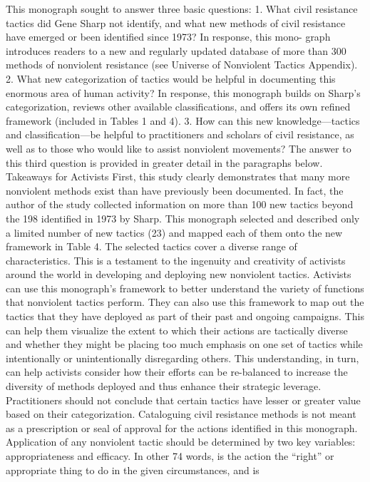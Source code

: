 \documentclass[twoside,a4paper,12pt,fleqn,openany]{extbook}
\begin{document}
This monograph sought to answer three basic questions:
1.	What civil resistance tactics did Gene Sharp not identify, and what new methods of
civil resistance have emerged or been identified since 1973? In response, this mono-
graph introduces readers to a new and regularly updated database of more than 300
methods of nonviolent resistance (see Universe of Nonviolent Tactics Appendix).
2.	 What new categorization of tactics would be helpful in documenting this enormous
area of human activity? In response, this monograph builds on Sharp’s categorization,
reviews other available classifications, and offers its own refined framework (included
in Tables 1 and 4).
3.	 How can this new knowledge—tactics and classification—be helpful to practitioners
and scholars of civil resistance, as well as to those who would like to assist nonviolent
movements? The answer to this third question is provided in greater detail in the
paragraphs below.
Takeaways for Activists
First, this study clearly demonstrates that many more nonviolent methods exist than have
previously been documented. In fact, the author of the study collected information on more
than 100 new tactics beyond the 198 identified in 1973 by Sharp.
This monograph selected and described only a limited number of new tactics (23) and
mapped each of them onto the new framework in Table 4. The selected tactics cover a diverse
range of characteristics. This is a testament to the ingenuity and creativity of activists around
the world in developing and deploying new nonviolent tactics.
Activists can use this monograph’s framework to better understand the variety of functions
that nonviolent tactics perform. They can also use this framework to map out the tactics that
they have deployed as part of their past and ongoing campaigns. This can help them visualize
the extent to which their actions are tactically diverse and whether they might be placing too
much emphasis on one set of tactics while intentionally or unintentionally disregarding others.
This understanding, in turn, can help activists consider how their efforts can be re-balanced
to increase the diversity of methods deployed and thus enhance their strategic leverage.
Practitioners should not conclude that certain tactics have lesser or greater value based
on their categorization. Cataloguing civil resistance methods is not meant as a prescription
or seal of approval for the actions identified in this monograph. Application of any nonviolent
tactic should be determined by two key variables: appropriateness and efficacy. In other
74
words, is the action the “right” or appropriate thing to do in the given circumstances, and is
\end{document}
